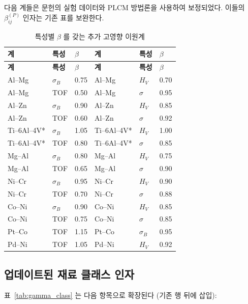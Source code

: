 \documentclass[12pt,a4paper]{article}
\begin{document}
	다음 계들은 문헌의 실험 데이터와 PLCM 방법론을 사용하여 보정되었다. 이들의 $\beta_{ij}^{(P)}$ 인자는 기존 표를 보완한다.
	
	\begin{longtable}{p{2.2cm} p{2.2cm} p{1.2cm} p{2.2cm} p{2.2cm} p{1.2cm}}
		\caption{특성별 $\beta$ 를 갖는 추가 고영향 이원계}\label{tab:beta_additional}\\
		\toprule
		\textbf{계} & \textbf{특성} & $\beta$ & \textbf{계} & \textbf{특성} & $\beta$ \\
		\midrule
		\endfirsthead
		\toprule
		\textbf{계} & \textbf{특성} & $\beta$ & \textbf{계} & \textbf{특성} & $\beta$ \\
		\midrule
		\endhead
		Al–Mg & $\sigma_B$ & 0.75 & Al–Mg & $H_V$ & 0.70 \\
		Al–Mg & TOF & 0.50 & Al–Mg & $\sigma$ & 0.95 \\
		Al–Zn & $\sigma_B$ & 0.90 & Al–Zn & $H_V$ & 0.85 \\
		Al–Zn & TOF & 0.60 & Al–Zn & $\sigma$ & 0.92 \\
		Ti–6Al–4V* & $\sigma_B$ & 1.05 & Ti–6Al–4V* & $H_V$ & 1.00 \\
		Ti–6Al–4V* & TOF & 0.80 & Ti–6Al–4V* & $\sigma$ & 0.85 \\
		Mg–Al & $\sigma_B$ & 0.80 & Mg–Al & $H_V$ & 0.75 \\
		Mg–Al & TOF & 0.65 & Mg–Al & $\sigma$ & 0.90 \\
		Ni–Cr & $\sigma_B$ & 0.95 & Ni–Cr & $H_V$ & 0.90 \\
		Ni–Cr & TOF & 0.70 & Ni–Cr & $\sigma$ & 0.88 \\
		Co–Ni & $\sigma_B$ & 0.90 & Co–Ni & $H_V$ & 0.85 \\
		Co–Ni & TOF & 0.75 & Co–Ni & $\sigma$ & 0.85 \\
		Pt–Co & TOF & 1.15 & Pt–Co & $\sigma_B$ & 0.95 \\
		Pd–Ni & TOF & 1.05 & Pd–Ni & $H_V$ & 0.92 \\
		\bottomrule
	\end{longtable}
	\vspace{0.2cm}
	
	\subsection*{업데이트된 재료 클래스 인자}
	표~\ref{tab:gamma_class} 는 다음 항목으로 확장된다 (기존 행 뒤에 삽입):
	
\end{document}
